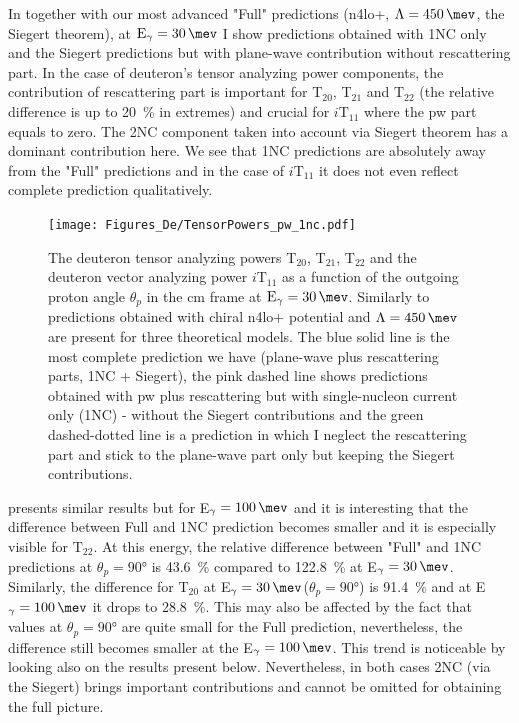     In  together with our most advanced "Full" predictions 
    (\gls{n4lo+}, $\Lambda=\SI{450}{\mev}$, the Siegert theorem),
    at $\text{E}_\gamma = \SI{30}{\mev}$ 
    I show predictions obtained with 1NC only and 
    the Siegert predictions but with plane-wave contribution without rescattering part.
    In the case of deuteron's tensor analyzing power components, the contribution of rescattering part is  
    important for T$_{20}$, T$_{21}$ and T$_{22}$ (the relative difference is up to \SI{20}{\percent} 
    in extremes) and crucial for
    $i\text{T}_{11}$ where the \gls{pw} part equals to zero.
    The 2NC component taken into account via Siegert theorem has a dominant contribution here. We see that 
    1NC predictions are absolutely away from the "Full" predictions and in the case of $i\text{T}_{11}$
    it does not even reflect complete prediction qualitatively.

    \begin{figure}[h]
        \begin{center}
        \texttt{[image: Figures\_De/TensorPowers\_pw\_1nc.pdf]}
        \end{center}
        \caption{The deuteron tensor analyzing powers T$_{20}$, T$_{21}$, T$_{22}$ and 
        the deuteron vector analyzing power $i\text{T}_{11}$ as a function of the
        outgoing proton angle $\theta_p$ in the \gls{cm} frame at $\text{E}_\gamma = \SI{30}{\mev}$.
        Similarly to  predictions obtained with chiral \gls{n4lo+} potential
        and $\Lambda=\SI{450}{\mev}$ are present for three theoretical models.
        The blue solid line is the most complete prediction we have 
        (plane-wave plus rescattering parts, 1NC + Siegert),
        the pink dashed line shows predictions obtained with
        \gls{pw} plus rescattering but with
        single-nucleon current only (1NC) - without the Siegert contributions and the green dashed-dotted line
        is a prediction in which I neglect the rescattering part
        and stick to the plane-wave part only but keeping the Siegert contributions.}
        \label{tensor_pw_1nc}
    \end{figure}

     presents similar results but for E$_\gamma = \SI{100}{\mev}$
    and it is interesting that the difference between Full and 1NC prediction becomes smaller
    and it is especially visible for $\text{T}_{22}$. At this energy, the relative difference 
    between "Full" and 1NC predictions
    at $\theta_p = \ang{90}$ is \SI{43.6}{\percent} compared to \SI{122.8}{\percent}
    at E$_\gamma = \SI{30}{\mev}$. Similarly, the difference for T$_{20}$
    at E$_\gamma = \SI{30}{\mev}$($\theta_p = \ang{90}$) is \SI{91.4}{\percent}
    and at E$_\gamma = \SI{100}{\mev}$ it drops to \SI{28.8}{\percent}.
    This may also be affected by the fact that values at $\theta_p = \ang{90}$ 
    are quite small for the Full prediction, nevertheless, the difference still becomes smaller at the
    E$_\gamma = \SI{100}{\mev}$.
    This trend is noticeable by looking also on the results present below.
    Nevertheless, in both cases 2NC (via the Siegert) brings important contributions
    and cannot be omitted for obtaining the full picture.

